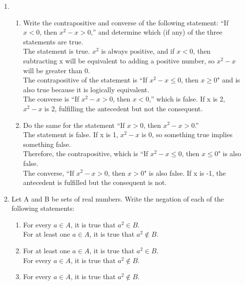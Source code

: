 \documentclass{article}
\begin{document}
\begin{enumerate}
\begin{enumerate}
            \end{enumerate}
      \item
            \begin{enumerate}
                  \item Write the contrapositive and converse of the following statement: “If $x < 0$, then $x^{2} - x > 0$,” and determine which (if any) of the three statements are true.\\
                        The statement is true. $x^{2}$ is always positive, and if $x < 0$, then subtracting x will be equivalent to adding a positive number, so $x^{2} - x$ will be greater than 0.\\
                        The contrapositive of the statement is “If $x^{2} - x \leq 0$, then $x \geq 0$" and is also true because it is logically equivalent.\\ 
                        The converse is “If $x^{2} - x > 0$, then $x < 0$,” which is false. If x is 2, $x^{2} - x$ is 2, fulfilling the antecedent but not the consequent.
                  \item Do the same for the statement “If $x > 0$, then $x^{2} - x > 0$.”\\
                        The statement is false. If x is 1, $x^{2} - x$ is 0, so something true implies something false.\\
                        Therefore, the contrapositive, which is “If $x^{2} - x \leq 0$, then $x \leq 0$" is also false.\\
                        The converse, “If $x^{2} - x > 0$, then $x > 0$" is also false. If x is -1, the antecedent is fulfilled but the consequent is not.
            \end{enumerate}
      \item Let A and B be sets of real numbers. Write the negation of each of the following statements:
            \begin{enumerate}
                  \item For every $a \in A$, it is true that $a^{2} \in B$.\\
                        For at least one $a \in A$, it is true that $a^{2} \notin B$.
                  \item For at least one $a \in A$, it is true that $a^{2} \in B$.\\
                        For every $a \in A$, it is true that $a^{2} \notin B$.
                  \item For every $a \in A$, it is true that $a^{2} \notin B$.\\

\end{enumerate}
\end{enumerate}
\end{document}
